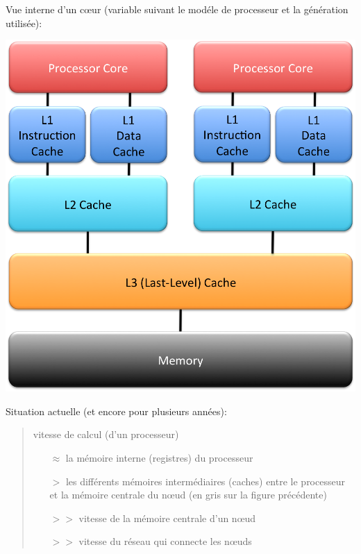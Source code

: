 \documentclass{beamer}
\begin{document}
\begin{frame}
Vue interne d'un c\oe ur (variable suivant le mod\'ele de processeur et la g\'en\'eration utilis\'ee):

\begin{center}
	\includegraphics[scale=0.3]{architecture2}
\end{center}

\end{frame}

\begin{frame}[fragile]
Situation actuelle (et encore pour plusieurs ann\'ees): 
\begin{quote}
	
	\vfill
	vitesse de calcul (d'un processeur)
	\vfill
	\begin{itemize}
		\item[$\approx$] la m\'emoire interne (registres) du processeur
	        \vfill
	        
		\item[$>$] les diff\'erents m\'emoires interm\'ediaires (caches) entre le processeur et la m\'emoire centrale du n\oe ud (en gris sur la figure pr\'ec\'edente)
			\vfill
			
		\item[$>>$] vitesse de la m\'emoire centrale d'un n\oe ud
			\vfill
			
		\item[$>>$] vitesse du r\'eseau qui connecte les n\oe uds
	\end{itemize}
	\vfill

\end{quote}

\end{frame}
\end{document}
